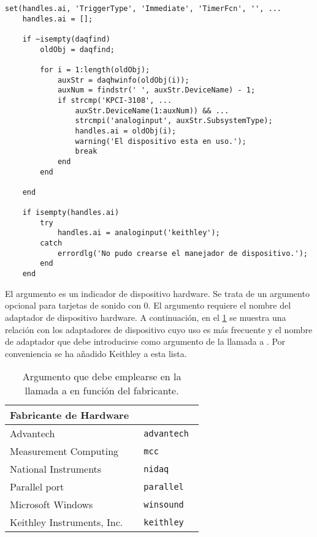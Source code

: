 \begin{lstlisting}[style=displayed, caption={[Método a seguir para crear un
	objeto dispositivo] {Método que evalúa la existencia de un objeto
	dispositivo previo a la llamada de la aplicación, en caso positivo
	lo hereda para su uso posterior, de lo contrario crea uno
	nuevo.}}, label={cod:constructor}]
	set(handles.ai, 'TriggerType', 'Immediate', 'TimerFcn', '', ...
	handles.ai = [];

	if ~isempty(daqfind)
		oldObj = daqfind;

		for i = 1:length(oldObj);
			auxStr = daqhwinfo(oldObj(i));
			auxNum = findstr(' ', auxStr.DeviceName) - 1;
			if strcmp('KPCI-3108', ...
				auxStr.DeviceName(1:auxNum)) && ...
				strcmpi('analoginput', auxStr.SubsystemType);
				handles.ai = oldObj(i);
				warning('El dispositivo esta en uso.');
				break
			end
		end

	end

	if isempty(handles.ai)
		try
			handles.ai = analoginput('keithley');
		catch
			errordlg('No pudo crearse el manejador de dispositivo.');
		end
	end
\end{lstlisting}

El argumento  es un indicador de dispositivo hardware. Se trata de
un argumento opcional para tarjetas de sonido con  0. El argumento
 requiere el nombre del adaptador de dispositivo hardware.
A continuación, en el \cref{tab:adaptors} se muestra una relación con los
adaptadores de dispositivo cuyo uso es más frecuente y el nombre de
adaptador que debe introducirse como argumento de la llamada a
. Por conveniencia se ha añadido Keithley a esta lista.

\begin{table}
	\centering
	\begin{tabular}{l >{\tt\qquad}l}
		\toprule
		\multicolumn{1}{c}{Fabricante de Hardware} %
		& \multicolumn{1}{c}{\rm Nombre de adaptador} \\
		\midrule
		Advantech & advantech \\
		\midrule
		Measurement Computing & mcc \\
		\midrule
		National Instruments & nidaq \\
		\midrule
		Parallel port & parallel \\
		\midrule
		Microsoft Windows & winsound \\
		\midrule
		Keithley Instruments, Inc. & keithley \\
		\bottomrule
	\end{tabular}
	\caption[Argumento que debe emplearse en la llamada a
	 en función del fabricante]{Argumento que debe
	emplearse en la llamada a  en función del
	fabricante.}
	\label{tab:adaptors}
\end{table}


